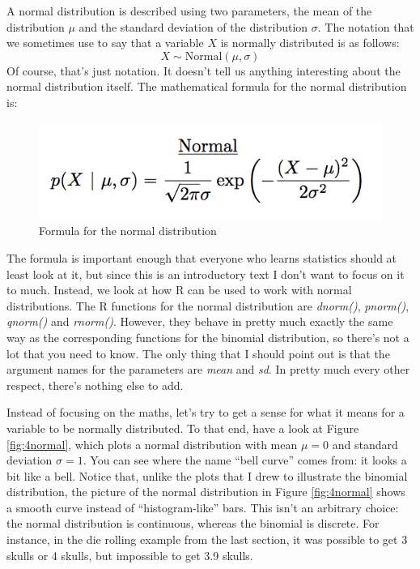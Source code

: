\documentclass[
]{book}
\begin{document}
A normal distribution is described using two parameters, the mean of the distribution \(\mu\) and the standard deviation of the distribution \(\sigma\). The notation that we sometimes use to say that a variable \(X\) is normally distributed is as follows: \[X \sim \mbox{Normal}(\mu,\sigma)\] Of course, that's just notation. It doesn't tell us anything interesting about the normal distribution itself. The mathematical formula for the normal distribution is:

\begin{figure}
\centering
\includegraphics{navarro_img/probability/Normal_formula.png}
\caption{\label{fig:4normalformula}Formula for the normal distribution}
\end{figure}

The formula is important enough that everyone who learns statistics should at least look at it, but since this is an introductory text I don't want to focus on it to much. Instead, we look at how R can be used to work with normal distributions. The R functions for the normal distribution are \emph{dnorm()}, \emph{pnorm()}, \emph{qnorm()} and \emph{rnorm()}. However, they behave in pretty much exactly the same way as the corresponding functions for the binomial distribution, so there's not a lot that you need to know. The only thing that I should point out is that the argument names for the parameters are \emph{mean} and \emph{sd}. In pretty much every other respect, there's nothing else to add.

Instead of focusing on the maths, let's try to get a sense for what it means for a variable to be normally distributed. To that end, have a look at Figure \ref{fig:4normal}, which plots a normal distribution with mean \(\mu = 0\) and standard deviation \(\sigma = 1\). You can see where the name ``bell curve'' comes from: it looks a bit like a bell. Notice that, unlike the plots that I drew to illustrate the binomial distribution, the picture of the normal distribution in Figure \ref{fig:4normal} shows a smooth curve instead of ``histogram-like'' bars. This isn't an arbitrary choice: the normal distribution is continuous, whereas the binomial is discrete. For instance, in the die rolling example from the last section, it was possible to get 3 skulls or 4 skulls, but impossible to get 3.9 skulls.
\end{document}
